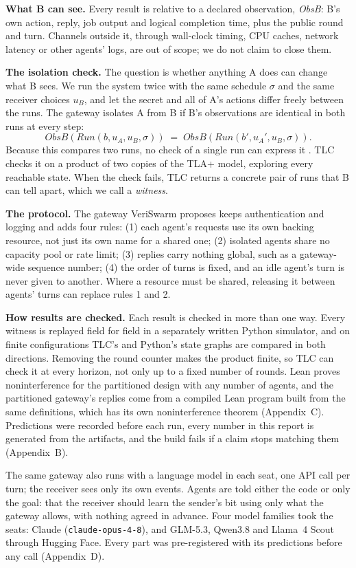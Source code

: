 \documentclass[11pt,letterpaper]{article}
\newcommand{\code}[1]{{\small\texttt{#1}}}
\begin{document}
\textbf{What B can see.} Every result is relative to a declared observation, \emph{ObsB}: B's own action, reply, job output and logical completion time, plus the public round and turn. Channels outside it, through wall-clock timing, CPU caches, network latency or other agents' logs, are out of scope; we do not claim to close them.

\textbf{The isolation check.} The question is whether anything A does can change what B sees. We run the system twice with the same schedule $\sigma$ and the same receiver choices $u_B$, and let the secret and all of A's actions differ freely between the runs. The gateway isolates A from B if B's observations are identical in both runs at every step:
\[
\mathit{ObsB}(\mathit{Run}(b,u_A,u_B,\sigma)) \;=\; \mathit{ObsB}(\mathit{Run}(b',u_A',u_B,\sigma)).
\]
Because this compares two runs, no check of a single run can express it \cite{clarkson2010}. TLC checks it on a product of two copies of the TLA+ model, exploring every reachable state. When the check fails, TLC returns a concrete pair of runs that B can tell apart, which we call a \emph{witness}.

\textbf{The protocol.} The gateway VeriSwarm proposes keeps authentication and logging and adds four rules: (1) each agent's requests use its own backing resource, not just its own name for a shared one; (2) isolated agents share no capacity pool or rate limit; (3) replies carry nothing global, such as a gateway-wide sequence number; (4) the order of turns is fixed, and an idle agent's turn is never given to another. Where a resource must be shared, releasing it between agents' turns can replace rules 1 and 2.

\textbf{How results are checked.} Each result is checked in more than one way. Every witness is replayed field for field in a separately written Python simulator, and on finite configurations TLC's and Python's state graphs are compared in both directions. Removing the round counter makes the product finite, so TLC can check it at every horizon, not only up to a fixed number of rounds. Lean proves noninterference for the partitioned design with any number of agents, and the partitioned gateway's replies come from a compiled Lean program built from the same definitions, which has its own noninterference theorem (Appendix~C). Predictions were recorded before each run, every number in this report is generated from the artifacts, and the build fails if a claim stops matching them (Appendix~B).

The same gateway also runs with a language model in each seat, one API call per turn; the receiver sees only its own events. Agents are told either the code or only the goal: that the receiver should learn the sender's bit using only what the gateway allows, with nothing agreed in advance. Four model families took the seats: Claude (\code{claude-opus-4-8}), and GLM-5.3, Qwen3.8 and Llama~4 Scout through Hugging Face. Every part was pre-registered with its predictions before any call (Appendix~D).
\end{document}
